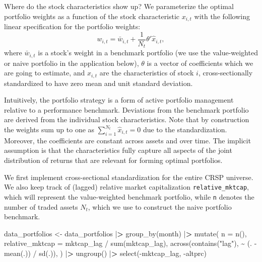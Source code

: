 \documentclass[
]{book}
\newenvironment{Shaded}{\begin{snugshade}}{\end{snugshade}}
\newcommand{\AttributeTok}[1]{\textcolor[rgb]{0.61,0.61,0.61}{#1}}
\newcommand{\ErrorTok}[1]{\textcolor[rgb]{0.14,0.14,0.14}{\textbf{#1}}}
\newcommand{\FunctionTok}[1]{\textcolor[rgb]{0,0,0}{#1}}
\newcommand{\NormalTok}[1]{#1}
\newcommand{\OtherTok}[1]{\textcolor[rgb]{0.37,0.37,0.37}{#1}}
\newcommand{\SpecialCharTok}[1]{\textcolor[rgb]{0,0,0}{#1}}
\newcommand{\StringTok}[1]{\textcolor[rgb]{0.5,0.5,0.5}{#1}}
\begin{document}
Where do the stock characteristics show up? We parameterize the optimal portfolio weights as a function of the stock characteristic \(x_{i,t}\) with the following linear specification for the portfolio weights:
\[w_{i,t} = \bar{w}_{i,t} + \frac{1}{N_t}\theta'\hat{x}_{i,t},\]
where \(\bar{w}_{i,t}\) is a stock's weight in a benchmark portfolio (we use the value-weighted or naive portfolio in the application below), \(\theta\) is a vector of coefficients which we are going to estimate, and \(\hat{x}_{i,t}\) are the characteristics of stock \(i\), cross-sectionally standardized to have zero mean and unit standard deviation.

Intuitively, the portfolio strategy is a form of active portfolio management relative to a performance benchmark. Deviations from the benchmark portfolio are derived from the individual stock characteristics. Note that by construction the weights sum up to one as \(\sum_{i=1}^{N_t}\hat{x}_{i,t} = 0\) due to the standardization. Moreover, the coefficients are constant across assets and over time. The implicit assumption is that the characteristics fully capture all aspects of the joint distribution of returns that are relevant for forming optimal portfolios.

We first implement cross-sectional standardization for the entire CRSP universe. We also keep track of (lagged) relative market capitalization \texttt{relative\_mktcap}, which will represent the value-weighted benchmark portfolio, while \texttt{n} denotes the number of traded assets \(N_t\), which we use to construct the naive portfolio benchmark.

\begin{Shaded}
\begin{Highlighting}[]
\NormalTok{data\_portfolios }\OtherTok{\textless{}{-}}\NormalTok{ data\_portfolios }\SpecialCharTok{|}\ErrorTok{\textgreater{}}
  \FunctionTok{group\_by}\NormalTok{(month) }\SpecialCharTok{|}\ErrorTok{\textgreater{}}
  \FunctionTok{mutate}\NormalTok{(}
    \AttributeTok{n =} \FunctionTok{n}\NormalTok{(),}
    \AttributeTok{relative\_mktcap =}\NormalTok{ mktcap\_lag }\SpecialCharTok{/} \FunctionTok{sum}\NormalTok{(mktcap\_lag),}
    \FunctionTok{across}\NormalTok{(}\FunctionTok{contains}\NormalTok{(}\StringTok{"lag"}\NormalTok{), }\SpecialCharTok{\textasciitilde{}}\NormalTok{ (. }\SpecialCharTok{{-}} \FunctionTok{mean}\NormalTok{(.)) }\SpecialCharTok{/} \FunctionTok{sd}\NormalTok{(.)),}
\NormalTok{  ) }\SpecialCharTok{|}\ErrorTok{\textgreater{}}
  \FunctionTok{ungroup}\NormalTok{() }\SpecialCharTok{|}\ErrorTok{\textgreater{}}
  \FunctionTok{select}\NormalTok{(}\SpecialCharTok{{-}}\NormalTok{mktcap\_lag, }\SpecialCharTok{{-}}\NormalTok{altprc)}
\end{Highlighting}
\end{Shaded}
\end{document}
